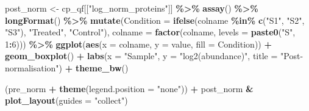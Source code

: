 \documentclass[9pt,a4paper,]{extarticle}
\newenvironment{Shaded}{\begin{snugshade}}{\end{snugshade}}
\newcommand{\AttributeTok}[1]{\textcolor[rgb]{0.13,0.29,0.53}{#1}}
\newcommand{\DecValTok}[1]{\textcolor[rgb]{0.00,0.00,0.81}{#1}}
\newcommand{\FunctionTok}[1]{\textcolor[rgb]{0.13,0.29,0.53}{\textbf{#1}}}
\newcommand{\NormalTok}[1]{#1}
\newcommand{\OtherTok}[1]{\textcolor[rgb]{0.56,0.35,0.01}{#1}}
\newcommand{\SpecialCharTok}[1]{\textcolor[rgb]{0.81,0.36,0.00}{\textbf{#1}}}
\newcommand{\StringTok}[1]{\textcolor[rgb]{0.31,0.60,0.02}{#1}}
\begin{document}
\begin{Shaded}
\begin{Highlighting}[]
\NormalTok{post\_norm }\OtherTok{\textless{}{-}}\NormalTok{ cp\_qf[[}\StringTok{"log\_norm\_proteins"}\NormalTok{]] }\SpecialCharTok{\%\textgreater{}\%}
  \FunctionTok{assay}\NormalTok{() }\SpecialCharTok{\%\textgreater{}\%}
  \FunctionTok{longFormat}\NormalTok{() }\SpecialCharTok{\%\textgreater{}\%}
  \FunctionTok{mutate}\NormalTok{(}\AttributeTok{Condition =} \FunctionTok{ifelse}\NormalTok{(colname }\SpecialCharTok{\%in\%} \FunctionTok{c}\NormalTok{(}\StringTok{"S1"}\NormalTok{, }\StringTok{"S2"}\NormalTok{, }\StringTok{"S3"}\NormalTok{),}
                            \StringTok{"Treated"}\NormalTok{, }\StringTok{"Control"}\NormalTok{),}
         \AttributeTok{colname =} \FunctionTok{factor}\NormalTok{(colname, }\AttributeTok{levels =} \FunctionTok{paste0}\NormalTok{(}\StringTok{"S"}\NormalTok{, }\DecValTok{1}\SpecialCharTok{:}\DecValTok{6}\NormalTok{))) }\SpecialCharTok{\%\textgreater{}\%}
  \FunctionTok{ggplot}\NormalTok{(}\FunctionTok{aes}\NormalTok{(}\AttributeTok{x =}\NormalTok{ colname, }\AttributeTok{y =}\NormalTok{ value, }\AttributeTok{fill =}\NormalTok{ Condition)) }\SpecialCharTok{+}
  \FunctionTok{geom\_boxplot}\NormalTok{() }\SpecialCharTok{+}
  \FunctionTok{labs}\NormalTok{(}\AttributeTok{x =} \StringTok{"Sample"}\NormalTok{, }\AttributeTok{y =} \StringTok{"log2(abundance)"}\NormalTok{, }\AttributeTok{title =} \StringTok{"Post{-}normalisation"}\NormalTok{) }\SpecialCharTok{+}
  \FunctionTok{theme\_bw}\NormalTok{()}

\NormalTok{(pre\_norm }\SpecialCharTok{+} \FunctionTok{theme}\NormalTok{(}\AttributeTok{legend.position =} \StringTok{"none"}\NormalTok{)) }\SpecialCharTok{+} 
\NormalTok{  post\_norm }\SpecialCharTok{\&} \FunctionTok{plot\_layout}\NormalTok{(}\AttributeTok{guides =} \StringTok{"collect"}\NormalTok{)}
\end{Highlighting}
\end{Shaded}
\end{document}
